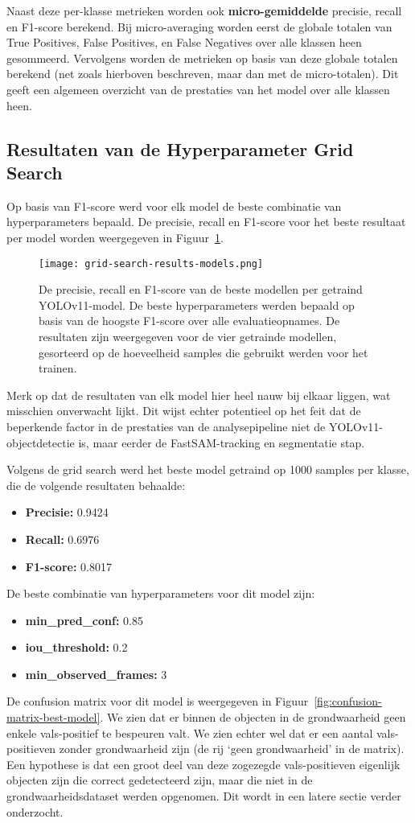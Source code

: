 Naast deze per-klasse metrieken worden ook \textbf{micro-gemiddelde} precisie, recall en F1-score berekend. 
Bij micro-averaging worden eerst de globale totalen van True Positives, False Positives, en False Negatives over alle klassen heen gesommeerd. 
Vervolgens worden de metrieken op basis van deze globale totalen berekend (net zoals hierboven beschreven, maar dan met de micro-totalen).
Dit geeft een algemeen overzicht van de prestaties van het model over alle klassen heen.

\subsection{Resultaten van de Hyperparameter Grid Search}

Op basis van F1-score werd voor elk model de beste combinatie van hyperparameters bepaald.
De precisie, recall en F1-score voor het beste resultaat per model worden weergegeven in Figuur~\ref{fig:best-models-metrics}.
\begin{figure}[H]
  \centering
  \texttt{[image: grid-search-results-models.png]}
  \caption[]{\label{fig:best-models-metrics} 
    De precisie, recall en F1-score van de beste modellen per getraind YOLOv11-model.
    De beste hyperparameters werden bepaald op basis van de hoogste F1-score over alle evaluatieopnames.
    De resultaten zijn weergegeven voor de vier getrainde modellen, gesorteerd op de hoeveelheid samples die gebruikt werden voor het trainen.
    }
\end{figure}
Merk op dat de resultaten van elk model hier heel nauw bij elkaar liggen, wat misschien onverwacht lijkt.
Dit wijst echter potentieel op het feit dat de beperkende factor in de prestaties van de analysepipeline niet de YOLOv11-objectdetectie is,
maar eerder de FastSAM-tracking en segmentatie stap.

Volgens de grid search werd het beste model getraind op 1000 samples per klasse, die de volgende resultaten behaalde:
\begin{itemize}
    \item \textbf{Precisie:} 0.9424
    \item \textbf{Recall:} 0.6976
    \item \textbf{F1-score:} 0.8017
\end{itemize}
De beste combinatie van hyperparameters voor dit model zijn:
\begin{itemize}
    \item \textbf{min\_pred\_conf:} 0.85
    \item \textbf{iou\_threshold:} 0.2
    \item \textbf{min\_observed\_frames:} 3
\end{itemize}
De confusion matrix voor dit model is weergegeven in Figuur~\ref{fig:confusion-matrix-best-model}.
We zien dat er binnen de objecten in de grondwaarheid geen enkele vals-positief te bespeuren valt.
We zien echter wel dat er een aantal vals-positieven zonder grondwaarheid zijn (de rij `geen grondwaarheid' in de matrix).
Een hypothese is dat een groot deel van deze zogezegde vals-positieven eigenlijk objecten zijn die correct gedetecteerd zijn, 
maar die niet in de grondwaarheidsdataset werden opgenomen.
Dit wordt in een latere sectie verder onderzocht.

